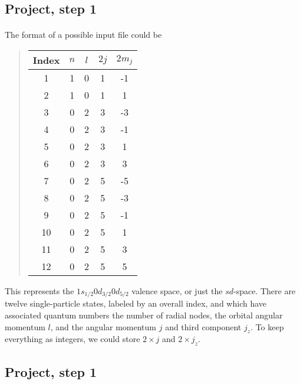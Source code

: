 \documentclass[%
twoside,                 %
final,                   %
10pt]{article}
\begin{document}
\noindent



\subsection*{Project, step 1}

\paragraph{}
The format of a possible input  file could be

\begin{quote}
\begin{tabular}{ccccc}
\hline
\multicolumn{1}{c}{ Index } & \multicolumn{1}{c}{ $n$ } & \multicolumn{1}{c}{ $l$ } & \multicolumn{1}{c}{ $2j$ } & \multicolumn{1}{c}{ $2m_j$ } \\
\hline
1     & 1   & 0   & 1    & -1     \\
2     & 1   & 0   & 1    & 1      \\
3     & 0   & 2   & 3    & -3     \\
4     & 0   & 2   & 3    & -1     \\
5     & 0   & 2   & 3    & 1      \\
6     & 0   & 2   & 3    & 3      \\
7     & 0   & 2   & 5    & -5     \\
8     & 0   & 2   & 5    & -3     \\
9     & 0   & 2   & 5    & -1     \\
10    & 0   & 2   & 5    & 1      \\
11    & 0   & 2   & 5    & 3      \\
12    & 0   & 2   & 5    & 5      \\
\hline
\end{tabular}
\end{quote}

\noindent
This represents the $1s_{1/2}0d_{3/2}0d_{5/2}$ valence space, or just the $sd$-space.  There are 
twelve single-particle states, labeled by an overall index, and which have associated quantum 
numbers the number of radial nodes, the orbital angular momentum $l$, and the 
angular momentum $j$ and third component $j_z$.  To keep everything as integers, we could store $2 \times j$ and 
$2 \times j_z$.



\subsection*{Project, step 1}
\end{document}
